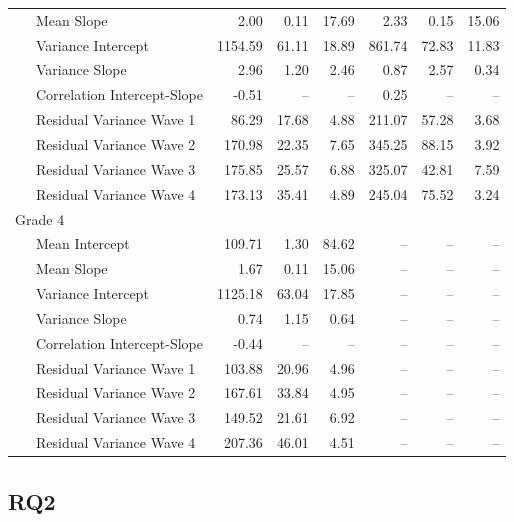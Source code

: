 \documentclass[
  english,
  man, fleqn, noextraspace]{apa6}
\begin{document}
\begin{center}
\begin{ThreePartTable}
\begin{longtable}{lrrrrrr}
\ \ \ Mean Slope & 2.00 & 0.11 & 17.69 & 2.33 & 0.15 & 15.06\\
\ \ \ Variance Intercept & 1154.59 & 61.11 & 18.89 & 861.74 & 72.83 & 11.83\\
\ \ \ Variance Slope & 2.96 & 1.20 & 2.46 & 0.87 & 2.57 & 0.34\\
\ \ \ Correlation Intercept-Slope & -0.51 & -- & -- & 0.25 & -- & --\\
\ \ \ Residual Variance Wave 1 & 86.29 & 17.68 & 4.88 & 211.07 & 57.28 & 3.68\\
\ \ \ Residual Variance Wave 2 & 170.98 & 22.35 & 7.65 & 345.25 & 88.15 & 3.92\\
\ \ \ Residual Variance Wave 3 & 175.85 & 25.57 & 6.88 & 325.07 & 42.81 & 7.59\\
\ \ \ Residual Variance Wave 4 & 173.13 & 35.41 & 4.89 & 245.04 & 75.52 & 3.24\\
Grade 4 &  &  &  &  &  & \\
\ \ \ Mean Intercept & 109.71 & 1.30 & 84.62 & -- & -- & --\\
\ \ \ Mean Slope & 1.67 & 0.11 & 15.06 & -- & -- & --\\
\ \ \ Variance Intercept & 1125.18 & 63.04 & 17.85 & -- & -- & --\\
\ \ \ Variance Slope & 0.74 & 1.15 & 0.64 & -- & -- & --\\
\ \ \ Correlation Intercept-Slope & -0.44 & -- & -- & -- & -- & --\\
\ \ \ Residual Variance Wave 1 & 103.88 & 20.96 & 4.96 & -- & -- & --\\
\ \ \ Residual Variance Wave 2 & 167.61 & 33.84 & 4.95 & -- & -- & --\\
\ \ \ Residual Variance Wave 3 & 149.52 & 21.61 & 6.92 & -- & -- & --\\
\ \ \ Residual Variance Wave 4 & 207.36 & 46.01 & 4.51 & -- & -- & --\\
\bottomrule
\end{longtable}

\end{ThreePartTable}
\end{center}

\hypertarget{rq2}{%
\subsection{RQ2}\label{rq2}}
\end{document}
